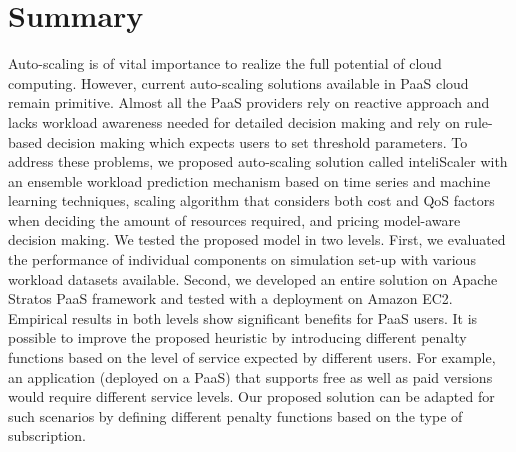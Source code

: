 \section{Summary}

Auto-scaling is of vital importance to realize the full potential of cloud computing. However, current auto-scaling solutions available in PaaS cloud remain primitive. Almost all the PaaS providers rely on reactive approach and lacks workload awareness needed for detailed decision making and rely on rule-based decision making which expects users to set threshold parameters. To address these problems, we proposed auto-scaling solution called inteliScaler with an ensemble workload prediction mechanism based on time series and machine learning techniques, scaling algorithm that considers both cost and QoS factors when deciding the amount of resources required, and pricing model-aware decision making. We tested the proposed model in two levels. First, we evaluated the performance of individual components on simulation set-up with various workload datasets available. Second, we developed an entire solution on Apache Stratos PaaS framework and tested with a deployment on Amazon EC2. Empirical results in both levels show significant benefits for PaaS users. It is possible to improve the proposed heuristic by introducing different penalty functions  based on the level of service expected by different users. For example, an application (deployed on a PaaS) that supports free as well as paid versions would require different service levels. Our proposed solution can be adapted for such scenarios by defining different penalty functions based on the type of subscription.\\